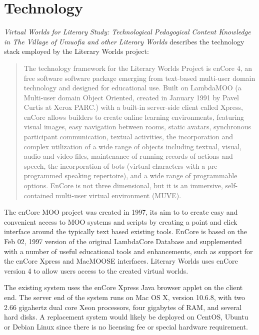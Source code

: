 \documentclass[12pt, letterpaper]{report}
\begin{document}
\section{Technology}
\par
\textit{Virtual Worlds for Literary Study: Technological Pedagogical Content Knowledge in \textit{The Village of Umuofia} and other Literary Worlds} describes the technology stack employed by the Literary Worlds project:
\begin{quotation}
The technology framework for the Literary Worlds Project is enCore 4, an free software software package emerging from text-based multi-user domain technology and designed for educational use. Built on LambdaMOO (a Multi-user domain Object Oriented, created in January 1991 by Pavel Curtis at Xerox PARC.\cite{Wired}) with a built-in server-side client called Xpress, enCore allows builders to create online learning environments, featuring visual images, easy navigation between rooms, static avatars, synchronous participant communication, textual activities, the incorporation and complex utilization of a wide range of objects including textual, visual, audio and video files, maintenance of running records of actions and speech, the incorporation of bots (virtual characters with a pre-programmed speaking repertoire), and a wide range of programmable options.  EnCore is not three dimensional, but it is an immersive, self-contained multi-user virtual environment (MUVE).\cite{VirtWorldsTech}
\end{quotation}
\par 
The enCore MOO project was created in 1997, its aim to to create easy and convenient access to MOO systems and scripts by creating a point and click interface around the typically text based existing tools. EnCore is based on the Feb 02, 1997 version of the original LambdaCore Database and supplemented with a number of useful educational tools and enhancements, such as support for the enCore Xpress and MacMOOSE interfaces. Literary Worlds uses enCore version 4 to allow users access to the created virtual worlds.

\par
The existing system uses the enCore Xpress Java browser applet on the client end. The server end of the system runs on Mac OS X, version 10.6.8, with two 2.66 gigahertz dual core Xeon processors, four gigabytes of RAM, and several hard disks. A replacement system would likely be deployed on CentOS, Ubuntu or Debian Linux since there is no licensing fee or special hardware requirement.
\end{document}
